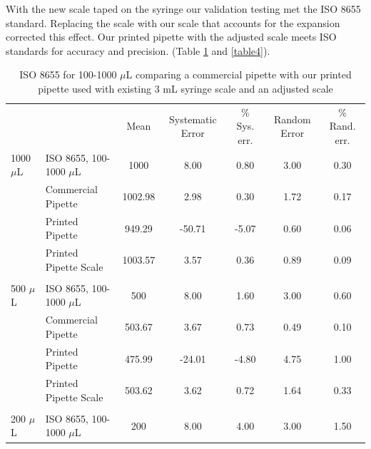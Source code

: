 \documentclass[10pt,letterpaper]{article}
\begin{document}
With the new scale taped on the syringe our validation testing met the ISO 8655 standard.
Replacing the scale with our scale that accounts for the expansion corrected this effect. 
Our printed pipette with the adjusted scale meets ISO standards for accuracy and precision. (Table \ref{table3} and \ref{table4}).

\begin{table}[!ht]
	\begin{adjustwidth}{-2.25in}{0in} %
		\centering
		\caption{ISO 8655 for 100-1000 $\mu$L comparing a commercial pipette with our printed pipette used with existing 3 mL syringe scale and an adjusted scale}
		\label{table3}
		\begin{tabular}{llccccc}
			&                       & Mean   & Systematic Error & \% Sys. err. & Random Error & \% Rand. err. \\
			1000 $\mu$L & ISO 8655, 100-1000 $\mu$L & 1000    & 8.00             & 0.80         & 3.00         & 0.30          \\
			& Commercial Pipette    & 1002.98 & 2.98             & 0.30         & 1.72         & 0.17          \\
			& Printed Pipette       & 949.29  & -50.71           & -5.07        & 0.60         & 0.06          \\
			& Printed Pipette Scale & 1003.57 & 3.57             & 0.36         & 0.89         & 0.09          \\
			&                       &         &                  &              &              &               \\
			500 $\mu$L  & ISO 8655, 100-1000 $\mu$L & 500     & 8.00             & 1.60         & 3.00         & 0.60          \\
			& Commercial Pipette    & 503.67  & 3.67             & 0.73         & 0.49         & 0.10          \\
			& Printed Pipette       & 475.99  & -24.01           & -4.80        & 4.75         & 1.00          \\
			& Printed Pipette Scale & 503.62  & 3.62             & 0.72         & 1.64         & 0.33          \\
			&                       &         &                  &              &              &               \\
			200 $\mu$L  & ISO 8655, 100-1000 $\mu$L & 200     & 8.00             & 4.00         & 3.00         & 1.50          \\

\end{tabular}
\end{adjustwidth}
\end{table}
\end{document}
